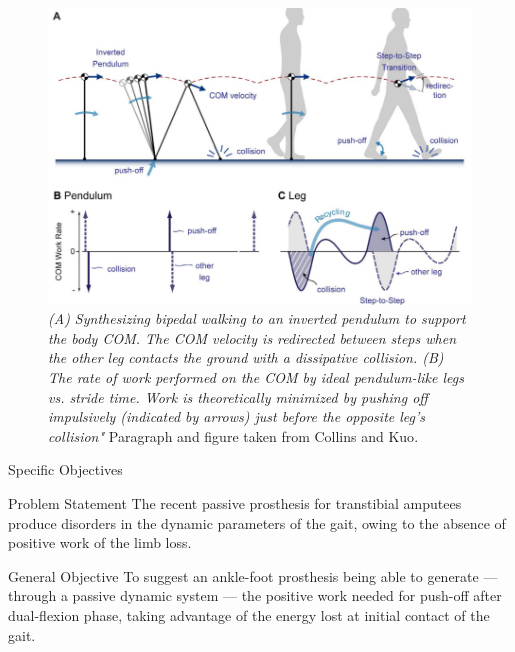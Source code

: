 \documentclass[10pt]{beamer}
\begin{document}
\begin{frame}
\begin{figure}[H]
\begin{centering}
\includegraphics[scale=0.3]{RecycledEng}
\par\end{centering}

\caption{\label{fig:(A)-Representaci=0000F3n-de}{\scriptsize \emph{(A) Synthesizing bipedal walking to an inverted pendulum to support the body COM. The COM velocity is redirected between steps when the other leg contacts the ground with a dissipative collision. (B) The rate of work performed on the COM by ideal pendulum-like legs vs. stride time. Work is theoretically minimized by pushing off impulsively (indicated by arrows) just before the opposite leg’s collision" }Paragraph and figure taken from Collins and Kuo\cite{Collins2010}.}}

\end{figure}

\end{frame}


\begin{frame}[fragile]{Specific Objectives}

\begin{alertblock}{Problem Statement} 
The recent passive prosthesis for transtibial amputees produce disorders in the dynamic parameters of the gait, owing to the absence of positive work of the limb loss.
\end{alertblock}


\begin{alertblock}{General Objective} 
To suggest an ankle-foot prosthesis being able to generate --- through a passive dynamic system --- the positive work needed for push-off after dual-flexion phase, taking advantage of the energy lost at initial contact of the gait.
\end{alertblock}

\end{frame}
\end{document}
